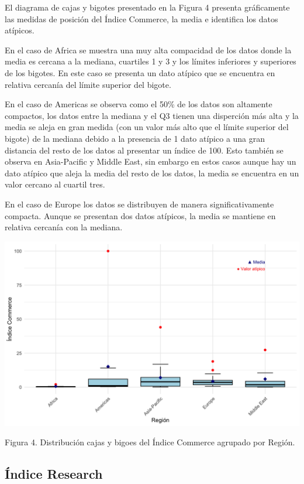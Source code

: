 \documentclass[
]{article}
\begin{document}
\begin{multicols}{2}
El diagrama de cajas y bigotes presentado en la Figura 4 presenta gráficamente las medidas de posición del Índice Commerce, la media e identifica los datos atípicos.

En el caso de Africa se muestra una muy alta compacidad de los datos donde la media es cercana a la mediana, cuartiles 1 y 3 y los límites inferiores y superiores de los bigotes. En este caso se presenta un dato atípico que se encuentra en relativa cercanía del límite superior del bigote.

En el caso de Americas se observa como el 50\% de los datos son altamente compactos, los datos entre la mediana y el Q3 tienen una disperción más alta y la media se aleja en gran medida (con un valor más alto que el límite superior del bigote) de la mediana debido a la presencia de 1 dato atípico a una gran distancia del resto de los datos al presentar un índice de 100. Esto también se observa en Asia-Pacific y Middle East, sin embargo en estos casos aunque hay un dato atípico que aleja la media del resto de los datos, la media se encuentra en un valor cercano al cuartil tres.

En el caso de Europe los datos se distribuyen de manera significativamente compacta. Aunque se presentan dos datos atípicos, la media se mantiene en relativa cercanía con la mediana.




\begin{center}
\includegraphics[width=\linewidth]{figura4.png}
\end{center}
Figura 4. Distribución cajas y bigoes del Índice Commerce agrupado por Región.


\subsection{Índice Research}


\end{multicols}
\end{document}
